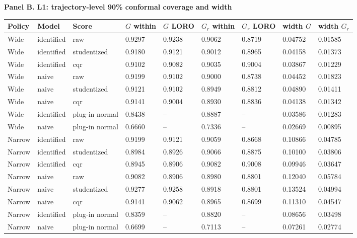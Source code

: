 \begin{table}[!ht]
\par\textbf{Panel B. L1: trajectory-level 90\% conformal coverage and width}

\begin{adjustbox}{max width=\linewidth}
\begin{tabular}{@{}lllllllll@{}}
\toprule
Policy & Model & Score & $G$ within & $G$ LORO & $G_r$ within & $G_r$ LORO & width $G$ & width $G_r$ \\
\midrule
Wide & identified & raw & 0.9297 & 0.9238 & 0.9062 & 0.8719 & 0.04752 & 0.01585 \\
Wide & identified & studentized & 0.9180 & 0.9121 & 0.9012 & 0.8965 & 0.04158 & 0.01373 \\
Wide & identified & cqr & 0.9102 & 0.9082 & 0.9035 & 0.9004 & 0.03867 & 0.01229 \\
Wide & naive & raw & 0.9199 & 0.9102 & 0.9000 & 0.8738 & 0.04452 & 0.01823 \\
Wide & naive & studentized & 0.9121 & 0.9102 & 0.8949 & 0.8812 & 0.04890 & 0.01411 \\
Wide & naive & cqr & 0.9141 & 0.9004 & 0.8930 & 0.8836 & 0.04138 & 0.01342 \\
Wide & identified & plug-in normal & 0.8438 & -- & 0.8887 & -- & 0.03586 & 0.01283 \\
Wide & naive & plug-in normal & 0.6660 & -- & 0.7336 & -- & 0.02669 & 0.00895 \\
Narrow & identified & raw & 0.9199 & 0.9121 & 0.9059 & 0.8668 & 0.10866 & 0.04785 \\
Narrow & identified & studentized & 0.8984 & 0.8926 & 0.9066 & 0.8875 & 0.10100 & 0.03806 \\
Narrow & identified & cqr & 0.8945 & 0.8906 & 0.9082 & 0.9008 & 0.09946 & 0.03647 \\
Narrow & naive & raw & 0.9082 & 0.8906 & 0.8980 & 0.8801 & 0.12040 & 0.05784 \\
Narrow & naive & studentized & 0.9277 & 0.9258 & 0.8918 & 0.8801 & 0.13524 & 0.04994 \\
Narrow & naive & cqr & 0.9141 & 0.9062 & 0.8965 & 0.8699 & 0.11310 & 0.04547 \\
Narrow & identified & plug-in normal & 0.8359 & -- & 0.8820 & -- & 0.08656 & 0.03498 \\
Narrow & naive & plug-in normal & 0.6699 & -- & 0.7113 & -- & 0.07261 & 0.02774 \\
\bottomrule
\end{tabular}
\end{adjustbox}
\vspace{0.5em}

\end{table}
